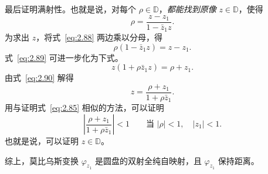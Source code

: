 最后证明满射性。也就是说，对每个 $\rho\in\mathbb D$，\emph{都能找到原像} $z\in\mathbb D$，使得
\begin{equation*}
  \rho=\frac{z-z_1}{1-\bar z_1z}.
  \tag{2.88}\label{eq:2.88}
\end{equation*}
为求出 $z$，将式~\eqref{eq:2.88} 两边乘以分母，得
\begin{equation*}
  \rho(1-\bar z_1z)=z-z_1.
  \tag{2.89}\label{eq:2.89}
\end{equation*}
式~\eqref{eq:2.89} 可进一步化为下式。
\begin{equation*}
  z(1+\rho\bar z_1z)=\rho+z_1.
  \tag{2.90}\label{eq:2.90}
\end{equation*}
由式~\eqref{eq:2.90} 解得
\begin{equation*}
  z=\frac{\rho+z_1}{1+\rho\bar z_1}.
  \tag{2.91}\label{eq:2.91}
\end{equation*}
用与证明式~\eqref{eq:2.85} 相似的方法，可以证明
\begin{equation*}
  \left|\frac{\rho+z_1}{1+\rho\bar z_1}\right|<1
    \qquad\text{当 }|\rho|<1,\quad |z_1|<1.
  \tag{2.92}\label{eq:2.92}
\end{equation*}
也就是说，可以证明 $z\in\mathbb D$。

综上，莫比乌斯变换 $\varphi_{z_1}$ 是圆盘的双射全纯自映射，且 $\varphi_{z_1}$ 保持距离。

